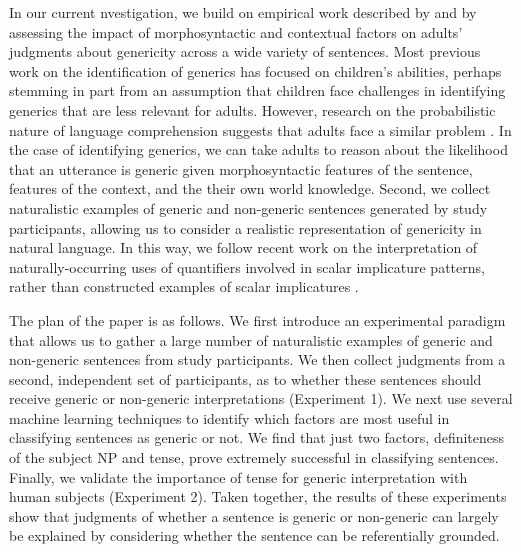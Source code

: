\documentclass[10pt,letterpaper]{article}
\begin{document}

In our current nvestigation, we build on empirical work described by  and  by assessing the impact of morphosyntactic and contextual factors on adults' judgments about genericity across a wide variety of sentences. Most previous work on the identification of generics has focused on children's abilities, perhaps stemming in part from an assumption that children face challenges in identifying generics that are less relevant for adults. However, research on the probabilistic nature of language comprehension suggests that adults face a similar problem \cite{Levy:2008,Frank:2012}. In the case of identifying generics, we can take adults to reason about the likelihood that an utterance is generic given morphosyntactic features of the sentence, features of the context, and the their own world knowledge. Second, we collect naturalistic examples of generic and non-generic sentences generated by study participants, allowing us to consider a realistic representation of genericity in natural language. In this way, we follow recent work on the interpretation of naturally-occurring uses of quantifiers involved in scalar implicature patterns, rather than constructed examples of scalar implicatures \cite{Degen:2015}.

The plan of the paper is as follows. We first introduce an experimental paradigm that allows us to gather a large number of naturalistic examples of generic and non-generic sentences from study participants. We then collect judgments from a second, independent set of participants, as to whether these sentences should receive generic or non-generic interpretations (Experiment 1). We next use several machine learning techniques to identify which factors are most useful in classifying sentences as generic or not. We find that just two factors, definiteness of the subject NP and tense, prove extremely successful in classifying sentences. Finally, we validate the importance of tense for generic interpretation with human subjects (Experiment 2). Taken together, the results of these experiments show that judgments of whether a sentence is generic or non-generic can largely be explained by considering whether the sentence can be referentially grounded.
\end{document}
